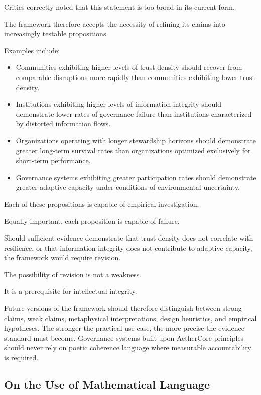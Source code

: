 \documentclass[12pt]{article}
\begin{document}
Critics correctly noted that this statement is too broad in its current form.

The framework therefore accepts the necessity of refining its claims into increasingly testable propositions.

Examples include:

\begin{itemize}
  \item Communities exhibiting higher levels of trust density should recover from comparable disruptions more rapidly than communities exhibiting lower trust density.
  \item Institutions exhibiting higher levels of information integrity should demonstrate lower rates of governance failure than institutions characterized by distorted information flows.
  \item Organizations operating with longer stewardship horizons should demonstrate greater long-term survival rates than organizations optimized exclusively for short-term performance.
  \item Governance systems exhibiting greater participation rates should demonstrate greater adaptive capacity under conditions of environmental uncertainty.
\end{itemize}

Each of these propositions is capable of empirical investigation.

Equally important, each proposition is capable of failure.

Should sufficient evidence demonstrate that trust density does not correlate with resilience, or that information integrity does not contribute to adaptive capacity, the framework would require revision.

The possibility of revision is not a weakness.

It is a prerequisite for intellectual integrity.

Future versions of the framework should therefore distinguish between strong claims, weak claims, metaphysical interpretations, design heuristics, and empirical hypotheses. The stronger the practical use case, the more precise the evidence standard must become. Governance systems built upon AetherCore principles should never rely on poetic coherence language where measurable accountability is required.

\subsection{On the Use of Mathematical Language}
\end{document}
